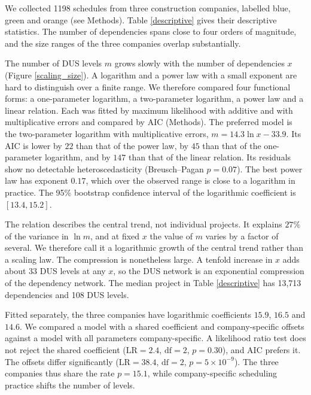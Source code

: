 \documentclass[11pt,a4paper]{article}
\begin{document}
We collected 1198 schedules from three construction companies, labelled blue, green and orange (see Methods). Table \ref{descriptive} gives their descriptive statistics. The number of dependencies spans close to four orders of magnitude, and the size ranges of the three companies overlap substantially.

The number of DUS levels $m$ grows slowly with the number of dependencies $x$ (Figure \ref{scaling_size}). A logarithm and a power law with a small exponent are hard to distinguish over a finite range. We therefore compared four functional forms: a one-parameter logarithm, a two-parameter logarithm, a power law and a linear relation. Each was fitted by maximum likelihood with additive and with multiplicative errors and compared by AIC (Methods). The preferred model is the two-parameter logarithm with multiplicative errors, $m = 14.3\ln x - 33.9$. Its AIC is lower by $22$ than that of the power law, by $45$ than that of the one-parameter logarithm, and by $147$ than that of the linear relation. Its residuals show no detectable heteroscedasticity (Breusch--Pagan $p = 0.07$). The best power law has exponent $0.17$, which over the observed range is close to a logarithm in practice. The 95\% bootstrap confidence interval of the logarithmic coefficient is $[13.4, 15.2]$.

The relation describes the central trend, not individual projects. It explains $27\%$ of the variance in $\ln m$, and at fixed $x$ the value of $m$ varies by a factor of several. We therefore call it a logarithmic growth of the central trend rather than a scaling law. The compression is nonetheless large. A tenfold increase in $x$ adds about $33$ DUS levels at any $x$, so the DUS network is an exponential compression of the dependency network. The median project in Table \ref{descriptive} has 13{,}713 dependencies and 108 DUS levels.

Fitted separately, the three companies have logarithmic coefficients $15.9$, $16.5$ and $14.6$. We compared a model with a shared coefficient and company-specific offsets against a model with all parameters company-specific. A likelihood ratio test does not reject the shared coefficient ($\mathrm{LR} = 2.4$, $\mathrm{df} = 2$, $p = 0.30$), and AIC prefers it. The offsets differ significantly ($\mathrm{LR} = 38.4$, $\mathrm{df} = 2$, $p = 5 \times 10^{-9}$). The three companies thus share the rate $p = 15.1$, while company-specific scheduling practice shifts the number of levels.
\end{document}
